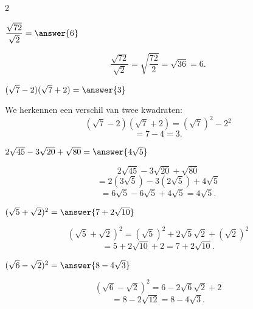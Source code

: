 \documentclass{ximera}
\begin{document}
\begin{oefening}[Wortels]{\oefB\ESS}
\begin{multicols}{2}
        
        \begin{question}
        $\dfrac{\sqrt{72}}{\sqrt2}=\answer{6}$
        
        \begin{oplossing}
        \[
        \dfrac{\sqrt{72}}{\sqrt2}
        =\sqrt{\dfrac{72}{2}}
        =\sqrt{36}
        =6.
        \]
        \end{oplossing}
        \end{question}
        
        
        \begin{question}
        $(\sqrt7-2)(\sqrt7+2)=\answer{3}$
        
        \begin{oplossing}
        We herkennen een verschil van twee kwadraten:
        \[
        (\sqrt7-2)(\sqrt7+2)
        =(\sqrt7)^2-2^2
        \]
        \[
        =7-4
        =3.
        \]
        \end{oplossing}
        \end{question}
        
        
        \begin{question}
        $2\sqrt{45}-3\sqrt{20}+\sqrt{80}
        =\answer{4\sqrt5}$
        
        \begin{oplossing}
        \[
        2\sqrt{45}-3\sqrt{20}+\sqrt{80}
        \]
        \[
        =2(3\sqrt5)-3(2\sqrt5)+4\sqrt5
        \]
        \[
        =6\sqrt5-6\sqrt5+4\sqrt5
        =4\sqrt5.
        \]
        \end{oplossing}
        \end{question}
        
        
        \begin{question}
        $(\sqrt5+\sqrt2)^2
        =\answer{7+2\sqrt{10}}$
        
        \begin{oplossing}
        \[
        (\sqrt5+\sqrt2)^2
        =(\sqrt5)^2+2\sqrt5\sqrt2+(\sqrt2)^2
        \]
        \[
        =5+2\sqrt{10}+2
        =7+2\sqrt{10}.
        \]
        \end{oplossing}
        \end{question}
        
        
        \begin{question}
        $(\sqrt6-\sqrt2)^2
        =\answer{8-4\sqrt3}$
        
        \begin{oplossing}
        \[
        (\sqrt6-\sqrt2)^2
        =6-2\sqrt6\sqrt2+2
        \]
        \[
        =8-2\sqrt{12}
        =8-4\sqrt3.
        \]
        \end{oplossing}
        \end{question}
        

\end{multicols}
\end{oefening}
\end{document}
